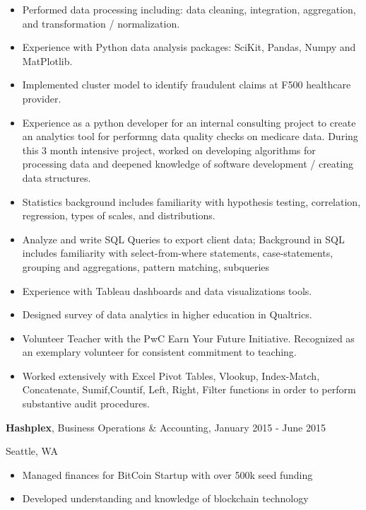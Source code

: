 \documentclass[margin,line]{res}
\begin{document}
\begin{resume}
\begin{itemize}[leftmargin=-.13in]
\item Performed data processing including: data cleaning, integration, aggregation, and transformation / normalization.
\item Experience with Python data analysis packages: SciKit, Pandas, Numpy and MatPlotlib.
\item Implemented cluster model to identify fraudulent claims at F500 healthcare provider.
\item Experience as a python developer for an internal consulting project to create an analytics tool for performng data quality checks on medicare data.  During this 3 month intensive project, worked on developing algorithms for processing data and deepened knowledge of software development / creating data structures.  
\item Statistics background includes familiarity with hypothesis testing, correlation, regression, types of scales, and distributions.  
\item Analyze and write SQL Queries to export client data; Background in SQL includes familiarity with select-from-where statements, case-statements, grouping and aggregations, pattern matching, subqueries
\item Experience with Tableau dashboards and data visualizations tools.
\item Designed survey of data analytics in higher education in Qualtrics.
\item Volunteer Teacher with the PwC Earn Your Future Initiative. Recognized as an exemplary volunteer for consistent commitment to teaching.  
\item Worked extensively with Excel Pivot Tables, Vlookup, Index-Match, Concatenate, Sumif,Countif, Left, Right, Filter functions in order to perform substantive audit procedures.  
\end{itemize}
\vspace*{1.5mm}


\vspace*{-3mm}
{\bf Hashplex},  Business Operations \& Accounting, January 2015 - June 2015

\vspace*{-4mm}Seattle, WA
\begin{itemize}[leftmargin=-.13in]
\item Managed finances for BitCoin Startup with over 500k seed funding
\item Developed understanding and knowledge of blockchain technology
\end{itemize}
\vspace*{3mm}


\end{resume}
\end{document}
